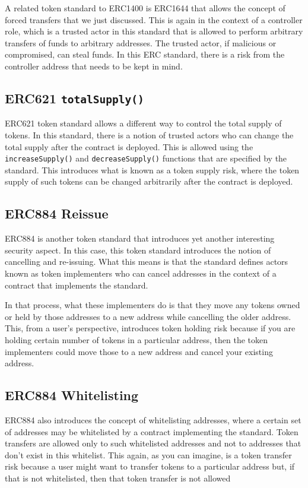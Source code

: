 A related token standard to ERC1400 is ERC1644 that allows the concept
of forced transfers that we just discussed. This is again in the context
of a controller role, which is a trusted actor in this standard that is
allowed to perform arbitrary transfers of funds to arbitrary addresses.
The trusted actor, if malicious or compromised, can steal funds. In this
ERC standard, there is a risk from the controller address that needs to
be kept in mind.

\subsection{\texorpdfstring{ERC621
\texttt{totalSupply()}}{ERC621 totalSupply()}}\label{erc621-totalsupply}

ERC621 token standard allows a different way to control the total supply
of tokens. In this standard, there is a notion of trusted actors who can
change the total supply after the contract is deployed. This is allowed
using the \texttt{increaseSupply()} and \texttt{decreaseSupply()}
functions that are specified by the standard. This introduces what is
known as a token supply risk, where the token supply of such tokens can
be changed arbitrarily after the contract is deployed.

\subsection{ERC884 Reissue}\label{erc884-reissue}

ERC884 is another token standard that introduces yet another interesting
security aspect. In this case, this token standard introduces the notion
of cancelling and re-issuing. What this means is that the standard
defines actors known as token implementers who can cancel addresses in
the context of a contract that implements the standard.

In that process, what these implementers do is that they move any tokens
owned or held by those addresses to a new address while cancelling the
older address. This, from a user's perspective, introduces token holding
risk because if you are holding certain number of tokens in a particular
address, then the token implementers could move those to a new address
and cancel your existing address.

\subsection{ERC884 Whitelisting}\label{erc884-whitelisting}

ERC884 also introduces the concept of whitelisting addresses, where a
certain set of addresses may be whitelisted by a contract implementing
the standard. Token transfers are allowed only to such whitelisted
addresses and not to addresses that don't exist in this whitelist. This
again, as you can imagine, is a token transfer risk because a user might
want to transfer tokens to a particular address but, if that is not
whitelisted, then that token transfer is not allowed
